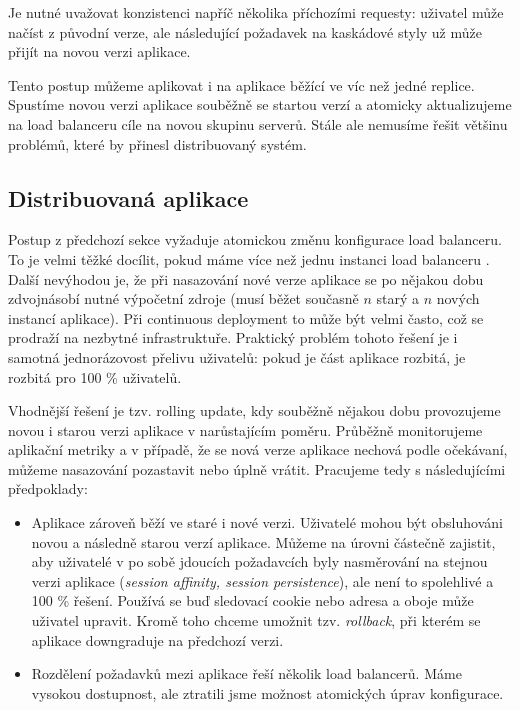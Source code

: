             Je nutné uvažovat konzistenci napříč několika příchozími \HTTP requesty: uživatel může načíst \HTML z původní verze, ale následující \HTTP požadavek na kaskádové styly už může přijít na novou verzi aplikace.

            Tento postup můžeme aplikovat i na aplikace běžící ve víc než jedné replice. Spustíme novou verzi aplikace souběžně se startou verzí a atomicky aktualizujeme na load balanceru cíle na novou skupinu serverů. Stále ale nemusíme řešit většinu problémů, které by přinesl distribuovaný systém.

        \subsection{Distribuovaná aplikace}
            \label{distributed-apps}
            Postup z předchozí sekce vyžaduje atomickou změnu konfigurace load balanceru. To je velmi těžké docílit, pokud máme více než jednu instanci load balanceru . Další nevýhodou je, že při nasazování nové verze aplikace se po nějakou dobu zdvojnásobí nutné výpočetní zdroje (musí běžet současně $n$ starý a $n$ nových instancí aplikace). Při continuous deployment to může být velmi často, což se prodraží na nezbytné infrastruktuře. Praktický problém tohoto řešení je i samotná jednorázovost přelivu uživatelů: pokud je část aplikace rozbitá, je rozbitá pro 100 \% uživatelů.

            Vhodnější řešení je tzv. rolling update, kdy souběžně nějakou dobu provozujeme novou i starou verzi aplikace v narůstajícím poměru. Průběžně monitorujeme aplikační metriky a v případě, že se nová verze aplikace nechová podle očekávaní, můžeme nasazování pozastavit nebo úplně vrátit. Pracujeme tedy s následujícími předpoklady:
            \begin{itemize}
                \item Aplikace zároveň běží ve staré i nové verzi. Uživatelé mohou být obsluhováni novou a následně starou verzí aplikace.  Můžeme na úrovni  částečně zajistit, aby uživatelé v po sobě jdoucích požadavcích byly nasměrování na stejnou verzi aplikace (\textit{session affinity, session persistence}), ale není to spolehlivé a 100 \% řešení. Používá se buď sledovací cookie nebo  adresa a oboje může uživatel upravit. Kromě toho chceme umožnit tzv. \textit{rollback}, při kterém se aplikace downgraduje na předchozí verzi.
                \item Rozdělení požadavků mezi aplikace řeší několik load balancerů. Máme vysokou dostupnost, ale ztratili jsme možnost atomických úprav konfigurace.
            \end{itemize}

